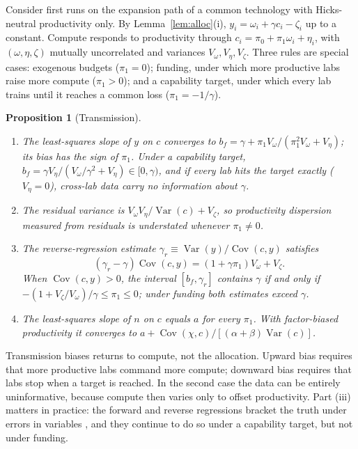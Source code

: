 \documentclass[AER,finalmode]{AEA}
\newtheorem{proposition}{Proposition}
\theoremstyle{definition}
\theoremstyle{remark}
\providecommand{\Var}{\operatorname{Var}}
\providecommand{\Cov}{\operatorname{Cov}}
\begin{document}
Consider first runs on the expansion path of a common technology with Hicks-neutral productivity only. By
Lemma~\ref{lem:alloc}(i), $y_i=\omega_i+\gamma c_i-\zeta_i$ up to a constant. Compute responds to productivity through
$c_i=\pi_0+\pi_1\omega_i+\eta_i$, with $(\omega,\eta,\zeta)$ mutually uncorrelated and variances
$V_\omega,V_\eta,V_\zeta$. Three rules are special cases: exogenous budgets ($\pi_1=0$); funding, under which more
productive labs raise more compute ($\pi_1>0$); and a capability target, under which every lab trains until it reaches
a common loss ($\pi_1=-1/\gamma$).

\begin{proposition}[Transmission]\label{prop:transmission}
\begin{enumerate}
\item[(i)] The least-squares slope of $y$ on $c$ converges to $b_f=\gamma+\pi_1V_\omega/(\pi_1^2V_\omega+V_\eta)$; its
bias has the sign of $\pi_1$. Under a capability target, $b_f=\gamma V_\eta/(V_\omega/\gamma^2+V_\eta)\in[0,\gamma)$,
and if every lab hits the target exactly ($V_\eta=0$), cross-lab data carry no information about $\gamma$.
\item[(ii)] The residual variance is $V_\omega V_\eta/\Var(c)+V_\zeta$, so productivity dispersion measured from
residuals is understated whenever $\pi_1\neq0$.
\item[(iii)] The reverse-regression estimate $\gamma_r\equiv\Var(y)/\Cov(c,y)$ satisfies
\[
(\gamma_r-\gamma)\Cov(c,y)=(1+\gamma\pi_1)V_\omega+V_\zeta .
\]
When $\Cov(c,y)>0$, the interval $[b_f,\gamma_r]$ contains $\gamma$ if and only if
$-(1+V_\zeta/V_\omega)/\gamma\le\pi_1\le0$; under funding both estimates exceed $\gamma$.
\item[(iv)] The least-squares slope of $n$ on $c$ equals $a$ for every $\pi_1$. With factor-biased productivity it
converges to $a+\Cov(\chi,c)/[(\alpha+\beta)\Var(c)]$.
\end{enumerate}
\end{proposition}

Transmission biases returns to compute, not the allocation. Upward bias requires that more productive labs command more
compute; downward bias requires that labs stop when a target is reached. In the second case the data can be entirely
uninformative, because compute then varies only to offset productivity. Part (iii) matters in practice: the forward and
reverse regressions bracket the truth under errors in variables \citep{klepper1984consistent}, and they continue to do
so under a capability target, but not under funding.
\end{document}
